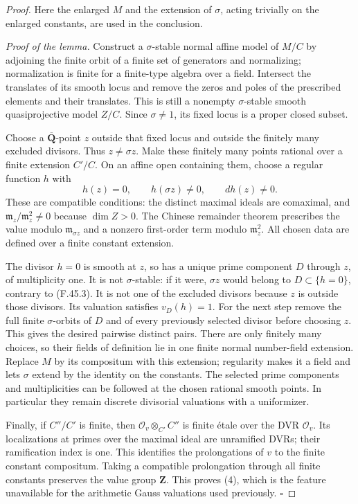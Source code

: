 \begin{proof}
Here the enlarged \(M\) and the extension of \(\sigma\), acting trivially
on the enlarged constants, are used in the conclusion.

\emph{Proof of the lemma.} Construct a \(\sigma\)-stable normal affine model of \(M/C\)
by adjoining the finite orbit of a finite set of generators and
normalizing; normalization is finite for a finite-type algebra over a
field. Intersect the translates of its smooth locus and remove the zeros
and poles of the prescribed elements and their translates. This is still
a nonempty \(\sigma\)-stable smooth quasiprojective model \(Z/C\).
Since \(\sigma\ne1\), its fixed locus is a proper closed subset.

Choose a \(\overline{\mathbf Q}\)-point \(z\) outside that fixed locus
and outside the finitely many excluded divisors. Thus
\(z\ne\sigma z\). Make these finitely many points rational over a finite
extension \(C'/C\). On an affine open containing them, choose a regular
function \(h\) with
\[
       h(z)=0,\qquad h(\sigma z)\ne0,\qquad dh(z)\ne0.    \tag{F.45.3}
\]
These are compatible conditions: the distinct maximal ideals are
comaximal, and \(\mathfrak m_z/\mathfrak m_z^2\ne0\) because
\(\dim Z>0\). The Chinese remainder theorem prescribes the value modulo
\(\mathfrak m_{\sigma z}\) and a nonzero first-order term modulo
\(\mathfrak m_z^2\). All chosen data are defined over a finite constant
extension.

The divisor \(h=0\) is smooth at \(z\), so has a unique prime component
\(D\) through \(z\), of multiplicity one. It is not
\(\sigma\)-stable: if it were, \(\sigma z\) would belong to
\(D\subset\{h=0\}\), contrary to \textup{(F.45.3)}. It is not one of the excluded
divisors because \(z\) is outside those divisors. Its valuation satisfies
\(v_D(h)=1\). For the next step remove the full finite
\(\sigma\)-orbits of \(D\) and of every previously selected divisor
before choosing \(z\). This gives the desired pairwise distinct pairs.
There are only finitely many choices, so their fields of definition lie
in one finite normal number-field extension. Replace \(M\) by its
compositum with this extension; regularity makes it a field and lets
\(\sigma\) extend by the identity on the constants. The selected prime
components and multiplicities can be followed at the chosen rational
smooth points. In particular they remain discrete divisorial valuations
with a uniformizer.

Finally, if \(C''/C'\) is finite, then
\(\mathcal O_v\otimes_{C'}C''\) is finite étale over the DVR
\(\mathcal O_v\). Its localizations at primes over the maximal ideal are
unramified DVRs; their ramification index is one. This identifies the
prolongations of \(v\) to the finite constant compositum. Taking a
compatible prolongation through all finite constants preserves the value
group \(\mathbf Z\). This proves (4), which is the feature unavailable
for the arithmetic Gauss valuations used previously. \(\square\)


\end{proof}
